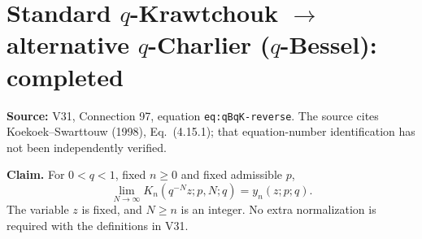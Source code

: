 \documentclass[11pt]{article}
\begin{document}
\section{Standard $q$-Krawtchouk $\to$ alternative $q$-Charlier ($q$-Bessel): completed}
\noindent\textbf{Source:} V31, Connection 97, equation \texttt{eq:qBqK-reverse}. The source cites Koekoek--Swarttouw (1998), Eq.~(4.15.1); that equation-number identification has not been independently verified.

\noindent\textbf{Claim.} For $0<q<1$, fixed $n\geq0$ and fixed admissible $p$,
\begin{equation}\label{eq:audit-qBqK-limit}
\boxed{\displaystyle\lim_{N\to\infty}K_n(q^{-N}z;p,N;q)=y_n(z;p;q).}
\end{equation}
The variable $z$ is fixed, and $N\geq n$ is an integer. No extra normalization is required with the definitions in V31.
\end{document}
